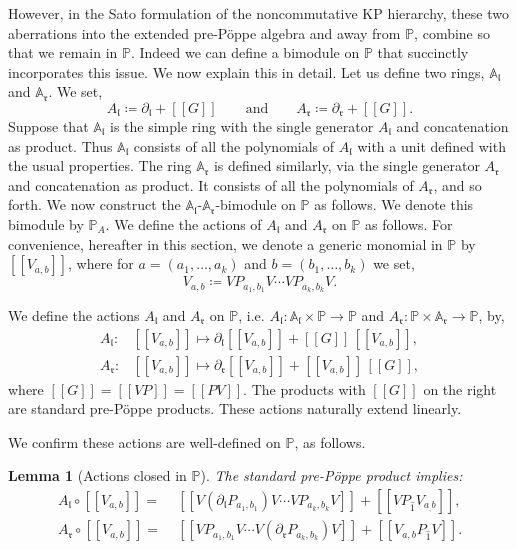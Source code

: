 \documentclass[5p,twocolumn]{elsarticle}
\newcommand*{\pa}{{\partial}}
\newcommand*{\lb}{[\![}
\newcommand*{\rb}{]\!]}
\newcommand*{\el}{\mathfrak l}
\newcommand*{\rl}{\mathfrak r}
\newtheorem{lemma}[theorem]{Lemma}
\begin{document}
However, in the Sato formulation of the noncommutative KP hierarchy, these two aberrations into the extended pre-P\"oppe algebra and away from $\mathbb P$, combine so that we remain in $\mathbb P$.
Indeed we can define a bimodule on $\mathbb P$ that succinctly incorporates this issue.
We now explain this in detail.
Let us define two rings, $\mathbb{A}_{\el}$ and $\mathbb{A}_{\rl}$. We set,
\begin{equation*}
A_{\el}\coloneqq\pa_{\el}+\lb G\rb\qquad\text{and}\qquad A_{\rl}\coloneqq\pa_{\rl}+\lb G\rb.
\end{equation*}
Suppose that $\mathbb{A}_{\el}$ is the simple ring with the single generator $A_{\el}$ and concatenation as product.
Thus $\mathbb{A}_{\el}$ consists of all the polynomials of $A_{\el}$ with a unit defined with the usual properties. 
The ring $\mathbb{A}_{\rl}$ is defined similarly, via the single generator $A_{\rl}$ and concatenation as product.
It consists of all the polynomials of $A_{\rl}$, and so forth.
We now construct the $\mathbb{A}_{\el}$-$\mathbb{A}_{\rl}$-bimodule on $\mathbb{P}$ as follows. We denote this bimodule by $\mathbb{P}_A$.
We define the actions of $A_{\el}$ and $A_{\rl}$ on $\mathbb{P}$ as follows.
For convenience, hereafter in this section, we denote a generic monomial in $\mathbb{P}$ by $\lb V_{a,b}\rb$, where for $a=(a_1,\ldots,a_k)$ and $b=(b_1,\ldots,b_k)$ we set,
\begin{equation*}
V_{a,b}\coloneqq VP_{a_1,b_1}V\cdots VP_{a_k,b_k}V.
\end{equation*}
%
\begin{definition}[Actions]\label{def:actions}
  We define the actions $A_{\el}$ and $A_{\rl}$ on $\mathbb{P}$, i.e.\/ $A_{\el}\colon\mathbb{A}_{\el}\times\mathbb P\to\mathbb P$ and $A_{\rl}\colon\mathbb P\times\mathbb{A}_{\rl}\to\mathbb P$, by,
  \begin{align*}
    A_{\el}\colon &\lb V_{a,b}\rb\mapsto \pa_{\el}\lb V_{a,b}\rb+\lb G\rb\,\lb V_{a,b}\rb,\\ 
    A_{\rl}\colon &\lb V_{a,b}\rb\mapsto \pa_{\rl}\lb V_{a,b}\rb+\lb V_{a,b}\rb\,\lb G\rb,
  \end{align*}
  where $\lb G\rb=\lb VP\rb=\lb PV\rb$. The products with $\lb G\rb$ on the right are standard pre-P\"oppe products. These actions naturally extend linearly.
\end{definition}
%
We confirm these actions are well-defined on $\mathbb{P}$, as follows.
%
\begin{lemma}[Actions closed in $\mathbb{P}$]\label{lemma:crucial}
  The standard pre-P\"oppe product implies:
  \begin{align*}
    A_{\el}\circ\lb V_{a,b}\rb=&\;\lb V(\pa_\el P_{a_1,b_1})V\cdots VP_{a_k,b_k}V\rb+\lb VP_{\hat{1}}V_{a_,b}\rb,\\
    A_{\rl}\circ\lb V_{a,b}\rb=&\;\lb VP_{a_1,b_1}V\cdots V(\pa_\rl P_{a_k,b_k})V\rb+\lb V_{a,b}P_{\hat{1}}V\rb.
  \end{align*}
\end{lemma}
\end{document}
